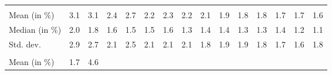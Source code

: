 \begin{tabular}{lllllllllllllll}
  \multicolumn{1}{|r}{} &
  \multicolumn{1}{r}{} &
  \multicolumn{1}{r}{} &
  \multicolumn{1}{r}{} &
  \multicolumn{1}{r}{} &
  \multicolumn{1}{r}{} &
  \multicolumn{1}{r}{} &
  \multicolumn{1}{r}{} &
  \multicolumn{1}{r}{} &
  \multicolumn{1}{r}{} &
  \multicolumn{1}{r}{} &
  \multicolumn{1}{r}{} &
  \multicolumn{1}{r}{} &
  \multicolumn{1}{r}{} \\
\multicolumn{1}{l}{\hspace{2em}Mean (in $\%$)} &
  \multicolumn{1}{|r}{3.1} &
  \multicolumn{1}{r}{3.1} &
  \multicolumn{1}{r}{2.4} &
  \multicolumn{1}{r}{2.7} &
  \multicolumn{1}{r}{2.2} &
  \multicolumn{1}{r}{2.3} &
  \multicolumn{1}{r}{2.2} &
  \multicolumn{1}{r}{2.1} &
  \multicolumn{1}{r}{1.9} &
  \multicolumn{1}{r}{1.8} &
  \multicolumn{1}{r}{1.8} &
  \multicolumn{1}{r}{1.7} &
  \multicolumn{1}{r}{1.7} &
  \multicolumn{1}{r}{1.6} \\
\multicolumn{1}{l}{\hspace{2em}Median (in $\%$)} &
  \multicolumn{1}{|r}{2.0} &
  \multicolumn{1}{r}{1.8} &
  \multicolumn{1}{r}{1.6} &
  \multicolumn{1}{r}{1.5} &
  \multicolumn{1}{r}{1.5} &
  \multicolumn{1}{r}{1.6} &
  \multicolumn{1}{r}{1.3} &
  \multicolumn{1}{r}{1.4} &
  \multicolumn{1}{r}{1.4} &
  \multicolumn{1}{r}{1.3} &
  \multicolumn{1}{r}{1.3} &
  \multicolumn{1}{r}{1.4} &
  \multicolumn{1}{r}{1.2} &
  \multicolumn{1}{r}{1.1} \\
\multicolumn{1}{l}{\hspace{2em}Std. dev.} &
  \multicolumn{1}{|r}{2.9} &
  \multicolumn{1}{r}{2.7} &
  \multicolumn{1}{r}{2.1} &
  \multicolumn{1}{r}{2.5} &
  \multicolumn{1}{r}{2.1} &
  \multicolumn{1}{r}{2.1} &
  \multicolumn{1}{r}{2.1} &
  \multicolumn{1}{r}{1.8} &
  \multicolumn{1}{r}{1.9} &
  \multicolumn{1}{r}{1.9} &
  \multicolumn{1}{r}{1.8} &
  \multicolumn{1}{r}{1.7} &
  \multicolumn{1}{r}{1.6} &
  \multicolumn{1}{r}{1.8} \\
\multicolumn{1}{l}{\hspace{1em}{\textit{Additive term} ($\widehat{t}/\widetilde{p}$)}} &
  \multicolumn{1}{|r}{} &
  \multicolumn{1}{r}{} &
  \multicolumn{1}{r}{} &
  \multicolumn{1}{r}{} &
  \multicolumn{1}{r}{} &
  \multicolumn{1}{r}{} &
  \multicolumn{1}{r}{} &
  \multicolumn{1}{r}{} &
  \multicolumn{1}{r}{} &
  \multicolumn{1}{r}{} &
  \multicolumn{1}{r}{} &
  \multicolumn{1}{r}{} &
  \multicolumn{1}{r}{} &
  \multicolumn{1}{r}{} \\
\multicolumn{1}{l}{\hspace{2em}Mean (in $\%$)} &
  \multicolumn{1}{|r}{1.7} &
  \multicolumn{1}{r}{4.6} &

\end{tabular}

